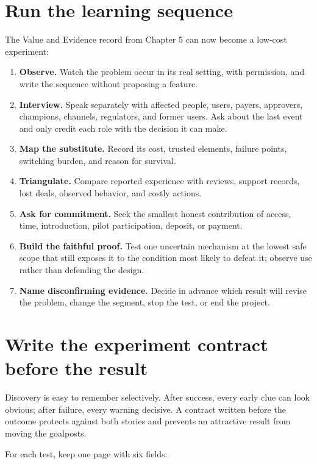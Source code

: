 \section{Run the learning sequence}

The Value and Evidence record from Chapter 5 can now become a low-cost
experiment:

\begin{enumerate}[itemsep=0.1em,topsep=0.2em]
\item \textbf{Observe.} Watch the problem occur in its real setting, with
  permission, and write the sequence without proposing a feature.
\item \textbf{Interview.} Speak separately with affected people, users, payers,
  approvers, champions, channels, regulators, and former users. Ask about the
  last event and only credit each role with the decision it can make.
\item \textbf{Map the substitute.} Record its cost, trusted elements, failure
  points, switching burden, and reason for survival.
\item \textbf{Triangulate.} Compare reported experience with reviews, support
  records, lost deals, observed behavior, and costly actions.
\item \textbf{Ask for commitment.} Seek the smallest honest contribution of
  access, time, introduction, pilot participation, deposit, or payment.
\item \textbf{Build the faithful proof.} Test one uncertain mechanism at the
  lowest safe scope that still exposes it to the condition most likely to
  defeat it; observe use rather than defending the design.
\item \textbf{Name disconfirming evidence.} Decide in advance which result will
  revise the problem, change the segment, stop the test, or end the project.
\end{enumerate}

\section{Write the experiment contract before the result}

Discovery is easy to remember selectively. After success, every early clue can
look obvious; after failure, every warning decisive. A contract written before
the outcome protects against both stories and prevents an attractive result
from moving the goalposts.

For each test, keep one page with six fields:

